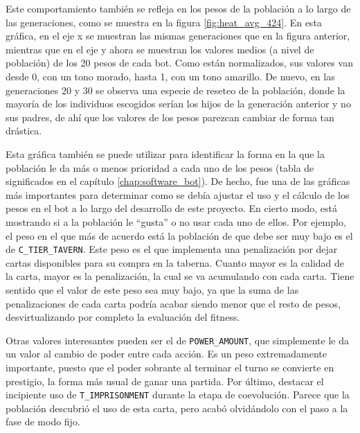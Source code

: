 Este comportamiento también se refleja en los pesos de la población a lo largo de las generaciones, como se muestra en la figura \ref{fig:heat_avg_424}. En esta gráfica, en el eje x se muestran las mismas generaciones que en la figura anterior, mientras que en el eje y ahora se muestran los valores medios (a nivel de población) de los 20 pesos de cada bot. Como están normalizados, sus valores van desde 0, con un tono morado, hasta 1, con un tono amarillo. De nuevo, en las generaciones 20 y 30 se observa una especie de reseteo de la población, donde la mayoría de los individuos escogidos serían los hijos de la generación anterior y no sus padres, de ahí que los valores de los pesos parezcan cambiar de forma tan drástica.

Esta gráfica también se puede utilizar para identificar la forma en la que la población le da más o menos prioridad a cada uno de los pesos (tabla de significados en el capítulo \ref{chap:software_bot}). De hecho, fue una de las gráficas más importantes para determinar como se debía ajustar el uso y el cálculo de los pesos en el bot a lo largo del desarrollo de este proyecto. En cierto modo, está mostrando si a la población le ``gusta'' o no usar cada uno de ellos. Por ejemplo, el peso en el que más de acuerdo está la población de que debe ser muy bajo es el de \texttt{C\_TIER\_TAVERN}. Este peso es el que implementa una penalización por dejar cartas disponibles para su compra en la taberna. Cuanto mayor es la calidad de la carta, mayor es la penalización, la cual se va acumulando con cada carta. Tiene sentido que el valor de este peso sea muy bajo, ya que la suma de las penalizaciones de cada carta podría acabar siendo menor que el resto de pesos, desvirtualizando por completo la evaluación del fitness.

Otras valores interesantes pueden ser el de \texttt{POWER\_AMOUNT}, que simplemente le da un valor al cambio de poder entre cada acción. Es un peso extremadamente importante, puesto que el poder sobrante al terminar el turno se convierte en prestigio, la forma más usual de ganar una partida. Por último, destacar el incipiente uso de \texttt{T\_IMPRISONMENT} durante la etapa de coevolución. Parece que la población descubrió el uso de esta carta, pero acabó olvidándolo con el paso a la fase de modo fijo.


